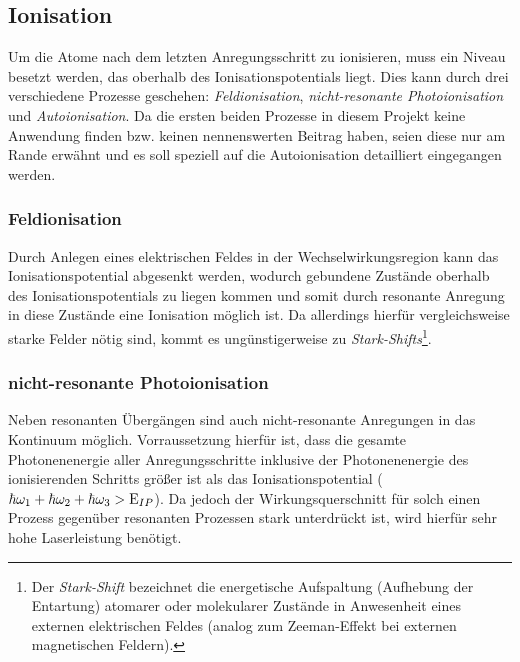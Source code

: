 \subsection{Ionisation}\label{subsec:ionisation}
Um die Atome nach dem letzten Anregungsschritt zu ionisieren, muss
ein Niveau besetzt werden, das oberhalb des Ionisationspotentials liegt. Dies
kann durch drei verschiedene Prozesse geschehen: \textit{Feldionisation},
\textit{nicht-resonante Photoionisation} und \textit{Autoionisation}. Da die
ersten beiden Prozesse in diesem Projekt keine Anwendung finden bzw.
keinen nennenswerten Beitrag haben, seien diese nur am Rande erwähnt und es soll
speziell auf die Autoionisation detailliert eingegangen werden.

\subsubsection{Feldionisation}\label{subsubsec:feldionisation}
Durch Anlegen eines elektrischen Feldes in der Wechselwirkungsregion kann das
Ionisationspotential abgesenkt werden, wodurch gebundene Zustände oberhalb des
Ionisationspotentials zu liegen kommen und somit durch resonante Anregung in
diese Zustände eine Ionisation möglich ist. Da allerdings hierfür
vergleichsweise starke Felder nötig sind, kommt es ungünstigerweise zu
\textit{Stark-Shifts}\footnote{Der \textit{Stark-Shift} bezeichnet die
energetische Aufspaltung (Aufhebung der Entartung) atomarer oder molekularer
Zustände in Anwesenheit eines externen elektrischen Feldes (analog zum
Zeeman-Effekt bei externen magnetischen Feldern).}.

\subsubsection{nicht-resonante
Photoionisation}\label{subsubsec:nicht-resonante_photoionisation}
Neben resonanten Übergängen sind auch nicht-resonante Anregungen in das
Kontinuum möglich. Vorraussetzung hierfür ist, dass die gesamte Photonenenergie
aller Anregungsschritte inklusive der Photonenenergie des ionisierenden Schritts
größer ist als das Ionisationspotential
($\hbar\omega_1+\hbar\omega_2+\hbar\omega_3>\operatorname{E}_{IP}$). Da jedoch der
Wirkungsquerschnitt für solch einen Prozess gegenüber resonanten Prozessen
stark unterdrückt ist, wird hierfür sehr hohe Laserleistung
benötigt.


